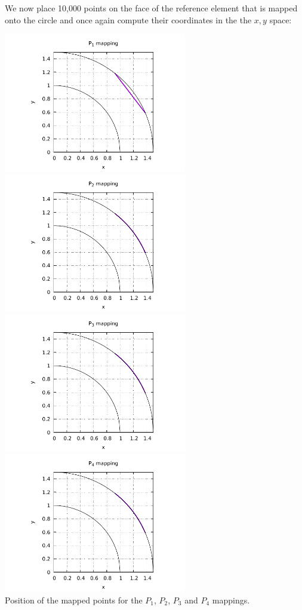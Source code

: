 We now place 10,000 points on the face of the reference element
that is mapped onto the circle and once again compute their coordinates in the the $x,y$ space:


\begin{center}
\includegraphics[width=8cm]{images/mappings/curved_triangles/xy1_line.pdf}
\includegraphics[width=8cm]{images/mappings/curved_triangles/xy2_line.pdf}\\
\includegraphics[width=8cm]{images/mappings/curved_triangles/xy3_line.pdf}
\includegraphics[width=8cm]{images/mappings/curved_triangles/xy4_line.pdf}\\
{\captionfont Position of the mapped points for the $P_1$, $P_2$, $P_3$ and $P_4$ mappings.}
\end{center}

